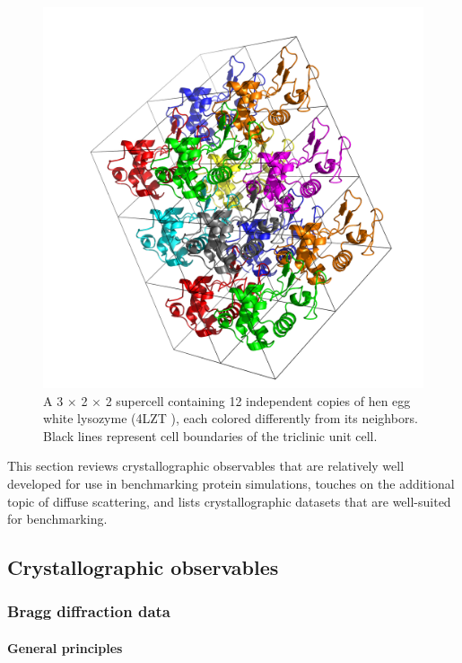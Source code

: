 \documentclass[9pt,review,pubversion]{livecoms}
\begin{document}
\begin{figure}[t]
    \centering
    \includegraphics[width=\linewidth]{4lzt-supercell.png}
    \caption{A 3 $\times$ 2 $\times$ 2 supercell containing 12 independent copies of hen egg white lysozyme (4LZT \cite{walsh_refinement_1998}), each colored differently from its neighbors.
    Black lines represent cell boundaries of the triclinic unit cell.}
    \label{fig:supercell}
\end{figure}

This section reviews crystallographic observables that are relatively well developed for use in benchmarking protein simulations, touches on the additional topic of diffuse scattering, and lists crystallographic datasets that are well-suited for benchmarking.

\subsection{Crystallographic observables}
\label{sub:xtal_obs}

\subsubsection{Bragg diffraction data}
\label{sub2:bragg}

\paragraph{General principles}
\end{document}
